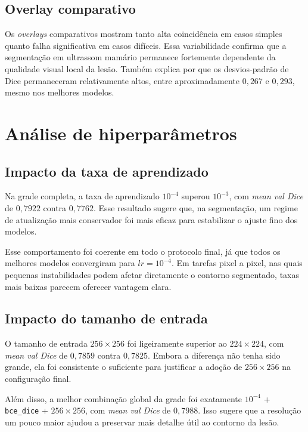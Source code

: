 \documentclass[tcc,capa]{texufpel}
\begin{document}
\subsection{Overlay comparativo}

Os \textit{overlays} comparativos mostram tanto alta coincidência em casos simples quanto falha significativa em casos difíceis. Essa variabilidade confirma que a segmentação em ultrassom mamário permanece fortemente dependente da qualidade visual local da lesão. Também explica por que os desvios-padrão de Dice permaneceram relativamente altos, entre aproximadamente \(0{,}267\) e \(0{,}293\), mesmo nos melhores modelos.

\section{Análise de hiperparâmetros}

\subsection{Impacto da taxa de aprendizado}

Na grade completa, a taxa de aprendizado \(10^{-4}\) superou \(10^{-3}\), com \textit{mean val Dice} de \(0{,}7922\) contra \(0{,}7762\). Esse resultado sugere que, na segmentação, um regime de atualização mais conservador foi mais eficaz para estabilizar o ajuste fino dos modelos.

Esse comportamento foi coerente em todo o protocolo final, já que todos os melhores modelos convergiram para \(lr = 10^{-4}\). Em tarefas pixel a pixel, nas quais pequenas instabilidades podem afetar diretamente o contorno segmentado, taxas mais baixas parecem oferecer vantagem clara.

\subsection{Impacto do tamanho de entrada}

O tamanho de entrada \(256\times256\) foi ligeiramente superior ao \(224\times224\), com \textit{mean val Dice} de \(0{,}7859\) contra \(0{,}7825\). Embora a diferença não tenha sido grande, ela foi consistente o suficiente para justificar a adoção de \(256\times256\) na configuração final.

Além disso, a melhor combinação global da grade foi exatamente \(10^{-4}\) + \texttt{bce\_dice} + \(256\times256\), com \textit{mean val Dice} de \(0{,}7988\). Isso sugere que a resolução um pouco maior ajudou a preservar mais detalhe útil ao contorno da lesão.
\end{document}

